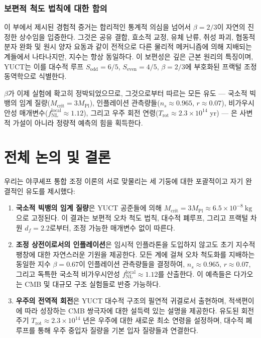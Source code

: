 \documentclass[11pt,a4paper]{article}
\begin{document}
\section{보편적 척도 법칙에 대한 함의}

이 부에서 제시된 경험적 증거는 합리적인 통계적 의심을 넘어서 \(\beta = 2/3\)이 자연의 진정한 상수임을 입증한다. 그것은 공유 결합, 효소적 교정, 유체 난류, 취성 파괴, 협동적 분자 완화 및 원시 양자 요동과 같이 전적으로 다른 물리적 메커니즘에 의해 지배되는 계들에서 나타나지만, 지수는 항상 동일하다. 이 보편성은 깊은 근본 원리의 특징이며, YUCT는 이를 대수적 루프 \(S_{\mathrm{odd}} = 6/5\), \(S_{\mathrm{even}} = 4/5\), \(\beta = 2/3\)에 부호화된 프랙털 조정 동역학으로 식별한다.

\(\beta\)가 이제 실험에 확고히 정박되었으므로, 그것으로부터 따르는 모든 유도 — 국소적 빅뱅의 임계 질량(\(M_{\mathrm{crit}} = 3M_{\mathrm{Pl}}\)), 인플레이션 관측량들(\(n_s \approx 0.965\), \(r \approx 0.07\)), 비가우시안성 매개변수(\(f_{\mathrm{NL}}^{\mathrm{local}} \approx 1.12\)), 그리고 우주 회전 연령(\(T_{\mathrm{rot}} \approx 2.3\times10^{14}\) yr) — 은 사변적 가설이 아니라 정량적 예측의 힘을 획득한다.


\part{전체 논의 및 결론}
\label{part:conclusion}

우리는 야쿠셰프 통합 조정 이론의 서로 맞물리는 세 기둥에 대한 포괄적이고 자기 완결적인 유도를 제시했다:

\begin{enumerate}
	\item \textbf{국소적 빅뱅의 임계 질량}은 YUCT 공준들에 의해 \(M_{\mathrm{crit}} = 3 M_{\mathrm{Pl}} \approx 6.5 \times 10^{-8}\ \text{kg}\)으로 고정된다. 이 결과는 보편적 오차 척도 법칙, 대수적 폐루프, 그리고 프랙털 차원 \(d_f = 2.2\)로부터, 조정 가능한 매개변수 없이 따른다.
	
	\item \textbf{조정 상전이로서의 인플레이션}은 임시적 인플라톤을 도입하지 않고도 초기 지수적 팽창에 대한 자연스러운 기원을 제공한다. 모든 계에 걸쳐 오차 척도화를 지배하는 동일한 지수 \(\beta = 0.67\)이 인플레이션 관측량들을 결정하여, \(n_s \approx 0.965\), \(r \approx 0.07\), 그리고 독특한 국소적 비가우시안성 \(f_{\mathrm{NL}}^{\mathrm{local}} \approx 1.12\)를 산출한다. 이 예측들은 다가오는 CMB 및 대규모 구조 실험들로 반증 가능하다.
	
	\item \textbf{우주의 전역적 회전}은 YUCT 대수적 구조의 필연적 귀결로서 출현하며, 적색편이에 따라 성장하는 CMB 쌍극자에 대한 설득력 있는 설명을 제공한다. 유도된 회전 주기 \(T_{\mathrm{rot}} \approx 2.3 \times 10^{14}\) 년은 우주에 대한 새로운 최소 연령을 설정하며, 대수적 폐루프를 통해 우주 중입자 질량을 기본 입자 질량들과 연결한다.
\end{enumerate}
\end{document}
